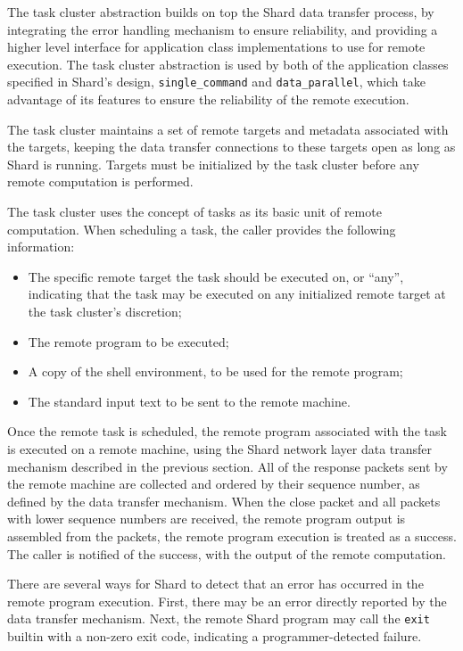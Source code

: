 \documentclass[twoside]{report}
\begin{document}
The task cluster abstraction builds on top the Shard data transfer process, by integrating the error handling mechanism to ensure reliability, and providing a higher level interface for application class implementations to use for remote execution.
The task cluster abstraction is used by both of the application classes specified in Shard's design, \texttt{single\_command} and \texttt{data\_parallel}, which take advantage of its features to ensure the reliability of the remote execution.

The task cluster maintains a set of remote targets and metadata associated with the targets, keeping the data transfer connections to these targets open as long as Shard is running.
Targets must be initialized by the task cluster before any remote computation is performed.

The task cluster uses the concept of tasks as its basic unit of remote computation.
When scheduling a task, the caller provides the following information:
\begin{itemize}
  \item The specific remote target the task should be executed on, or ``any'', indicating that the task may be executed on any initialized remote target at the task cluster's discretion;
  \item The remote program to be executed;
  \item A copy of the shell environment, to be used for the remote program;
  \item The standard input text to be sent to the remote machine.
\end{itemize}
Once the remote task is scheduled, the remote program associated with the task is executed on a remote machine, using the Shard network layer data transfer mechanism described in the previous section.
All of the response packets sent by the remote machine are collected and ordered by their sequence number, as defined by the data transfer mechanism.
When the close packet and all packets with lower sequence numbers are received, the remote program output is assembled from the packets, the remote program execution is treated as a success.
The caller is notified of the success, with the output of the remote computation.

There are several ways for Shard to detect that an error has occurred in the remote program execution.
First, there may be an error directly reported by the data transfer mechanism.
Next, the remote Shard program may call the \texttt{exit} builtin with a non-zero exit code, indicating a programmer-detected failure.
\end{document}
